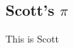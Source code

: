 \subsection{Scott's $\pi$}
\label{chp:fundamentals:sec:inter_rater_agreement:subsec:scotts_pi}
This is Scott
